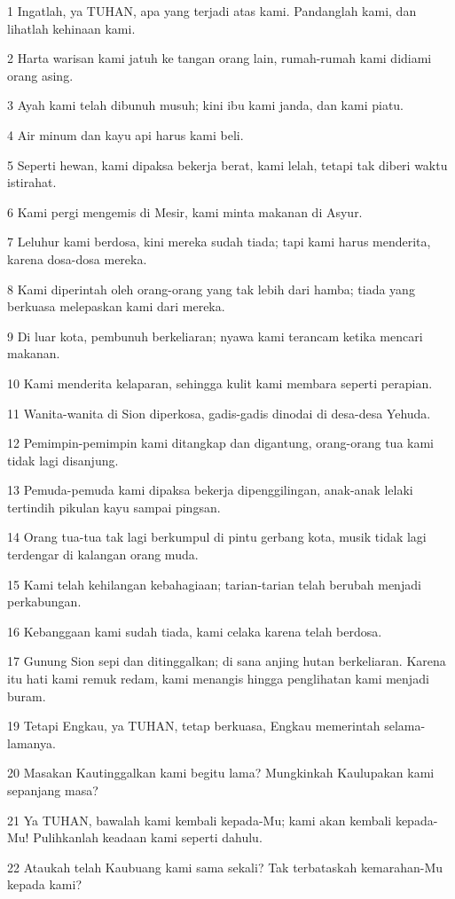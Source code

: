 \par 1 Ingatlah, ya TUHAN, apa yang terjadi atas kami. Pandanglah kami, dan lihatlah kehinaan kami.
\par 2 Harta warisan kami jatuh ke tangan orang lain, rumah-rumah kami didiami orang asing.
\par 3 Ayah kami telah dibunuh musuh; kini ibu kami janda, dan kami piatu.
\par 4 Air minum dan kayu api harus kami beli.
\par 5 Seperti hewan, kami dipaksa bekerja berat, kami lelah, tetapi tak diberi waktu istirahat.
\par 6 Kami pergi mengemis di Mesir, kami minta makanan di Asyur.
\par 7 Leluhur kami berdosa, kini mereka sudah tiada; tapi kami harus menderita, karena dosa-dosa mereka.
\par 8 Kami diperintah oleh orang-orang yang tak lebih dari hamba; tiada yang berkuasa melepaskan kami dari mereka.
\par 9 Di luar kota, pembunuh berkeliaran; nyawa kami terancam ketika mencari makanan.
\par 10 Kami menderita kelaparan, sehingga kulit kami membara seperti perapian.
\par 11 Wanita-wanita di Sion diperkosa, gadis-gadis dinodai di desa-desa Yehuda.
\par 12 Pemimpin-pemimpin kami ditangkap dan digantung, orang-orang tua kami tidak lagi disanjung.
\par 13 Pemuda-pemuda kami dipaksa bekerja dipenggilingan, anak-anak lelaki tertindih pikulan kayu sampai pingsan.
\par 14 Orang tua-tua tak lagi berkumpul di pintu gerbang kota, musik tidak lagi terdengar di kalangan orang muda.
\par 15 Kami telah kehilangan kebahagiaan; tarian-tarian telah berubah menjadi perkabungan.
\par 16 Kebanggaan kami sudah tiada, kami celaka karena telah berdosa.
\par 17 Gunung Sion sepi dan ditinggalkan; di sana anjing hutan berkeliaran. Karena itu hati kami remuk redam, kami menangis hingga penglihatan kami menjadi buram.
\par 19 Tetapi Engkau, ya TUHAN, tetap berkuasa, Engkau memerintah selama-lamanya.
\par 20 Masakan Kautinggalkan kami begitu lama? Mungkinkah Kaulupakan kami sepanjang masa?
\par 21 Ya TUHAN, bawalah kami kembali kepada-Mu; kami akan kembali kepada-Mu! Pulihkanlah keadaan kami seperti dahulu.
\par 22 Ataukah telah Kaubuang kami sama sekali? Tak terbataskah kemarahan-Mu kepada kami?


